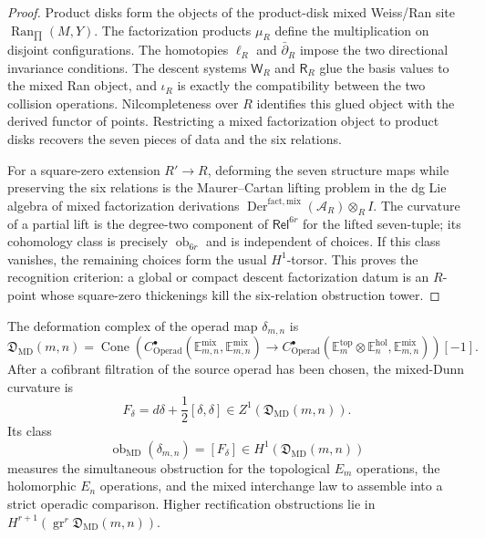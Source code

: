 \begin{proof}
  Product disks form the objects of the product-disk mixed Weiss/Ran
  site \(\operatorname{Ran}_{\prod}(M,Y)\).  The factorization products \(\mu_R\) define the
  multiplication on disjoint configurations.  The homotopies
  \(\ell_R\) and \(\bar\partial_R\) impose the two directional
  invariance conditions.  The descent systems \(\mathsf W_R\) and
  \(\mathsf R_R\) glue the basis values to the mixed Ran object, and
  \(\iota_R\) is exactly the compatibility between the two collision
  operations.  Nilcompleteness over \(R\) identifies this glued object
  with the derived functor of points.  Restricting a mixed
  factorization object to product disks recovers the seven pieces of
  data and the six relations.

  For a square-zero extension \(R'\to R\), deforming the seven
  structure maps while preserving the six relations is the
  Maurer--Cartan lifting problem in the dg Lie algebra of mixed
  factorization derivations
  \(\operatorname{Der}^{\mathrm{fact,mix}}(\mathcal A_R)\otimes_R I\).
  The curvature of a partial lift is the degree-two component of
  \(\mathsf{Rel}^{6r}\) for the lifted seven-tuple; its cohomology class
  is precisely \(\operatorname{ob}_{6r}\) and is independent of choices.
  If this class vanishes, the remaining choices form the usual
  \(H^1\)-torsor.  This proves the recognition criterion: a global or
  compact descent factorization datum is an \(R\)-point whose square-zero
  thickenings kill the six-relation obstruction tower.
\end{proof}

\begin{defn}\label{defn:mixed-dunn-obstruction-complex}
  The deformation complex of the operad map
  \(\delta_{m,n}\) is
  \[
    \mathfrak D_{\mathrm{MD}}(m,n)=
    \operatorname{Cone}\!\left(
      C^\bullet_{\mathrm{Operad}}\!
        (\mathbb E_{m,n}^{\mathrm{mix}},\mathbb E_{m,n}^{\mathrm{mix}})
      \longrightarrow
      C^\bullet_{\mathrm{Operad}}\!
        (\mathbb E_m^{\mathrm{top}}\otimes\mathbb E_n^{\mathrm{hol}},
         \mathbb E_{m,n}^{\mathrm{mix}})
    \right)[-1].
  \]
  After a cofibrant filtration of the source operad has been chosen, the
  mixed-Dunn curvature is
  \[
    F_{\delta}=d\delta+\frac12[\delta,\delta]
      \in Z^1(\mathfrak D_{\mathrm{MD}}(m,n)).
  \]
  Its class
  \[
    \operatorname{ob}_{\mathrm{MD}}(\delta_{m,n})
      =[F_\delta]\in H^1(\mathfrak D_{\mathrm{MD}}(m,n))
  \]
  measures the simultaneous obstruction for the topological \(E_m\)
  operations, the holomorphic \(E_n\) operations, and the mixed
  interchange law to assemble into a strict operadic comparison.  Higher
  rectification obstructions lie in
  \(H^{r+1}(\operatorname{gr}^r\mathfrak D_{\mathrm{MD}}(m,n))\).
\end{defn}

